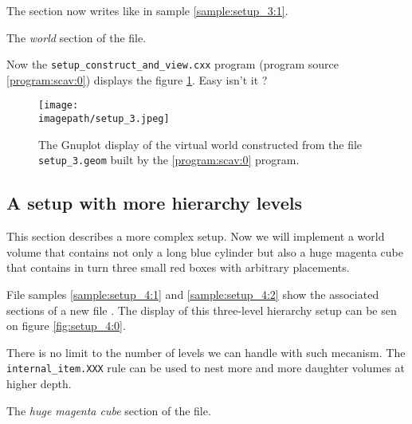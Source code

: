 The  section now writes like in sample \ref{sample:setup_3:1}.
\begin{sample}[h]
\caption{The \emph{world} section of the  file.}
\label{sample:setup_3:1}
\end{sample}

Now the \texttt{setup\_construct\_and\_view.cxx} program (program source 
\ref{program:scav:0}) displays the figure \ref{fig:setup_3:0}.
Easy isn't it ?

\begin{figure}[h]
\begin{center}
\texttt{[image: \\imagepath/setup\_3.jpeg]}
\end{center}
\caption{The Gnuplot  display of the  virtual world constructed
  from   the   file   \texttt{setup\_3.geom}  built   by   the
  \ref{program:scav:0} program.}\label{fig:setup_3:0}
\end{figure}

\clearpage

\subsection{A setup with more hierarchy levels}

This section describes a more complex setup. Now we will implement a
world volume that contains not only a long blue cylinder but also
a huge magenta cube that contains in turn three small red boxes
with arbitrary placements. 

File samples \ref{sample:setup_4:1} and \ref{sample:setup_4:2}
show the associated sections of a new file .
The display of this three-level hierarchy setup can be sen on figure \ref{fig:setup_4:0}.

There is no limit to the number of levels we can handle with such mecanism.
The \texttt{internal\_item.XXX} rule can be used to nest more and more 
daughter volumes at higher depth.

\begin{sample}[h]
\caption{The \emph{huge magenta cube}
  section of the   file.}
\label{sample:setup_4:1}
\end{sample}

